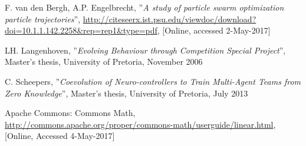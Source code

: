 \newpage

\begin{thebibliography}{9}
F. van den Bergh, A.P. Engelbrecht, ''\textit{A study of particle swarm optimization particle trajectories}'', \url{http://citeseerx.ist.psu.edu/viewdoc/download?doi=10.1.1.142.2258&rep=rep1&type=pdf}, [Online, accessed 2-May-2017]



LH. Langenhoven, ''\textit{Evolving Behaviour through Competition Special Project}'', Master's thesis, University of Pretoria, November 2006

C. Scheepers, ''\textit{Coevolution of Neuro-controllers to Train Multi-Agent Teams from Zero Knowledge}'', Master's thesis, University of Pretoria, July 2013

Apache Commons: Commons Math, \url{http://commons.apache.org/proper/commons-math/userguide/linear.html}, [Online, Accessed 4-May-2017]











\end{thebibliography}

